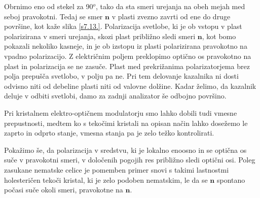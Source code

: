 Obrnimo eno od stekel za 90$^{o}$, tako da sta smeri urejanja na
obeh mejah med seboj pravokotni. Tedaj se smer $\mathbf{n}$ v plasti
zvezno zavrti od ene do druge površine, kot kaže slika \ref{s7.13.}.
Polarizacija svetlobe, ki je ob vstopu v plast polarizirana v smeri
urejanja, skozi plast približno sledi smeri $\mathbf{n}$, kot bomo pokazali
nekoliko kasneje, in je ob izstopu iz plasti polarizirana pravokotno
na vpadno polarizacijo. Z električnim poljem preklopimo optično os
pravokotno na plast in polarizacija se ne zasuče. Plast med prekrižanima
polarizatorjema brez polja prepušča svetlobo, v polju pa ne. Pri tem
delovanje kazalnika ni dosti odvisno niti od debeline plasti niti
od valovne dolžine. Kadar želimo, da kazalnik deluje v odbiti svetlobi,
damo za zadnji analizator še odbojno površino.

Pri kristalnem elektro-optičnem modulatorju smo lahko dobili tudi vmesne
prepustnosti, medtem ko s tekočimi kristali na opisan način lahko
dosežemo le zaprto in odprto stanje, vmesna stanja pa je zelo težko
kontrolirati.

Pokažimo še, da polarizacija v sredstvu, ki je lokalno enoosno in
se optična os suče v pravokotni smeri, v določenih pogojih res približno
sledi optični osi. Poleg zasukane nematske celice je pomemben primer
snovi s takimi lastnostmi holesteričen tekoči kristal, ki je zelo
podoben nematskim, le da se $\mathbf{n}$ spontano počasi suče okoli
smeri, pravokotne na $\mathbf{n}$.

